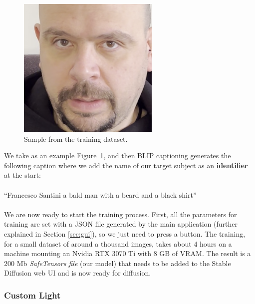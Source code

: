 \documentclass[preprint]{elsarticle}
\begin{document}
\begin{figure}[t]
	\centering
	\includegraphics[scale=0.3, keepaspectratio]{img/project_img/santini-training.png}
	\caption{Sample from the training dataset.}
	\label{fig:santini-training}
\end{figure}


We take as an example Figure~\ref{fig:santini-training}, 
and then BLIP captioning generates the following caption 
where we add the name of our target subject as an \textbf{identifier} at the start:\\\\
``Francesco Santini a bald man with a beard and a black shirt''\\\\
We are now ready to start the training process. 
First, all the parameters for training are set with a JSON file generated by the main application 
(further explained in Section \ref{sec:gui}), 
so we just need to press a button. 
The training, for a small dataset of around a thousand images, 
takes about 4 hours on a machine mounting an Nvidia RTX 3070 Ti with 8 GB of VRAM. 
The result is a 200 Mb \emph{SafeTensors file} (our model) 
that needs to be added to the Stable Diffusion web UI and is now ready for diffusion.

\subsubsection{Custom Light}
\end{document}
